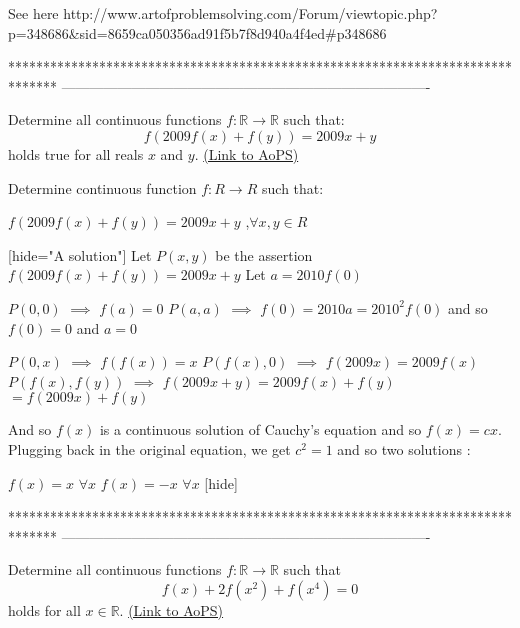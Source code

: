 \begin{solution}
	See here http://www.artofproblemsolving.com/Forum/viewtopic.php?p=348686&sid=8659ca050356ad91f5b7f8d940a4f4ed#p348686
\end{solution}
*******************************************************************************
-------------------------------------------------------------------------------

\begin{problem}
	Determine all continuous functions $f: \mathbb R \to \mathbb R$ such that:
\[f(2009f(x) + f(y)) = 2009x + y\]
holds true for all reals $x$ and $y$.
	\flushright \href{https://artofproblemsolving.com/community/c6h320387}{(Link to AoPS)}
\end{problem}



\begin{solution}
	\begin{tcolorbox}Determine continuous function $ f: R\to R$ such that:

$ f(2009f(x) + f(y)) = 2009x + y$ ,$ \forall x,y \in R$\end{tcolorbox}

[hide="A solution"]
Let $ P(x,y)$ be the assertion $ f(2009f(x) + f(y)) = 2009x + y$
Let $ a = 2010f(0)$

$ P(0,0)$ $ \implies$ $ f(a) = 0$
$ P(a,a)$ $ \implies$ $ f(0) = 2010a = 2010^2f(0)$ and so $ f(0) = 0$ and $ a = 0$

$ P(0,x)$ $ \implies$ $ f(f(x)) = x$
$ P(f(x),0)$ $ \implies$ $ f(2009x) = 2009f(x)$
$ P(f(x),f(y))$ $ \implies$ $ f(2009x + y) = 2009f(x) + f(y)$ $ = f(2009x) + f(y)$

And so $ f(x)$ is a continuous solution of Cauchy's equation and so $ f(x) = cx$. Plugging back in the original equation, we get $ c^2 = 1$ and so two solutions :

$ f(x) = x$ $ \forall x$
$ f(x) = - x$ $ \forall x$
[\/hide]
\end{solution}
*******************************************************************************
-------------------------------------------------------------------------------

\begin{problem}
	Determine all continuous functions $f: \mathbb R \to \mathbb R$ such that
\[f(x)+2f(x^2)+f(x^4)=0\]
holds for all $ x \in \mathbb R$.
	\flushright \href{https://artofproblemsolving.com/community/c6h320460}{(Link to AoPS)}
\end{problem}



